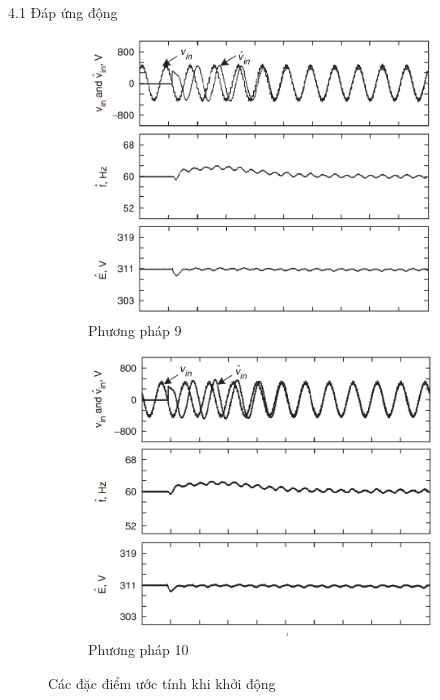 \documentclass[11pt]{beamer}
\begin{document}
\begin{frame}[t]{4.1 Đáp ứng động}
	\begin{figure}
		\ContinuedFloat
		\begin{subfigure}{0.5\textwidth}
			\includegraphics[width=\linewidth]{fig12i}
			\caption{Phương pháp 9}
		\end{subfigure}%
		\begin{subfigure}{0.5\textwidth}
			\includegraphics[width=\linewidth]{fig12j}
			\caption{Phương pháp 10}
		\end{subfigure}
		\caption{Các đặc điểm ước tính khi khởi động}
	\end{figure}	
	
\end{frame}
\end{document}
